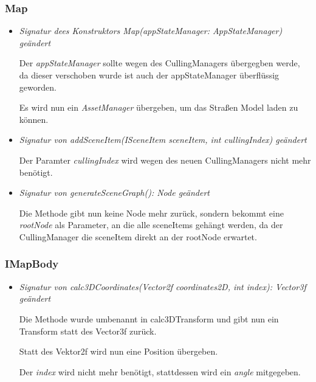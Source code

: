 \subsubsection{Map}
\begin{itemize}
    \item \textit{Signatur dees Konstruktors Map(appStateManager: AppStateManager) geändert}
        \begin{leftbar}[0.9\linewidth]
            Der \textit{appStateManager} sollte wegen des CullingManagers übergegben werde, da dieser verschoben wurde
            ist auch der appStateManager überflüssig geworden.\par

            Es wird nun ein \textit{AssetManager} übergeben, um das Straßen Model laden zu können.
        \end{leftbar}
        
    \item \textit{Signatur von addSceneItem(ISceneItem sceneItem, int cullingIndex)  geändert}
        \begin{leftbar}[0.9\linewidth]
            Der Paramter \textit{cullingIndex} wird wegen des neuen CullingManagers nicht mehr benötigt.
        \end{leftbar}
        
    \item \textit{Signatur von generateSceneGraph(): Node  geändert}
        \begin{leftbar}[0.9\linewidth]
            Die Methode gibt nun keine Node mehr zurück, sondern bekommt eine \textit{rootNode} als Parameter, an die alle 
            sceneItems gehängt werden, da der CullingManager die sceneItem direkt an der rootNode erwartet.
        \end{leftbar}
\end{itemize}

\subsubsection{IMapBody}
\begin{itemize}
    \item \textit{Signatur von calc3DCoordinates(Vector2f coordinates2D, int index): Vector3f geändert}
        \begin{leftbar}[0.9\linewidth]
            Die Methode wurde umbenannt in calc3DTransform und gibt nun ein Transform statt des Vector3f zurück.\par

            Statt des Vektor2f wird nun eine Position übergeben.\par

            Der \textit{index} wird nicht mehr benötigt, stattdessen wird ein \textit{angle} mitgegeben.
        \end{leftbar}
\end{itemize}

